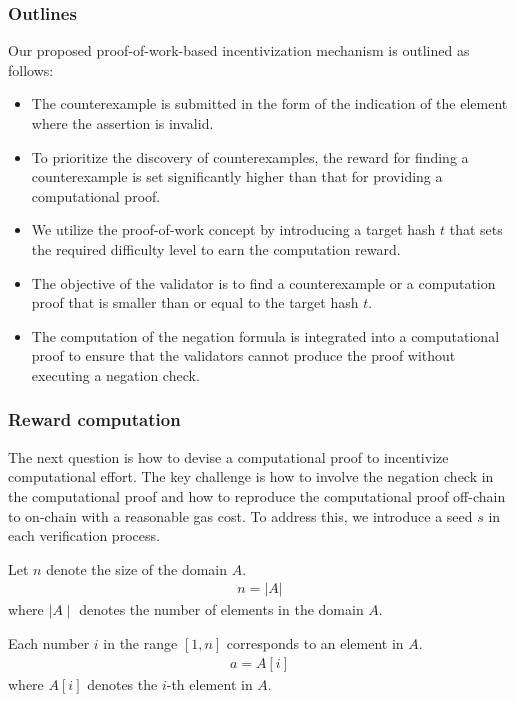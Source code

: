 \documentclass[runningheads]{llncs}
\begin{document}
\subsubsection{Outlines}
Our proposed proof-of-work-based incentivization mechanism is outlined as follows:
\begin{itemize}
\item The counterexample is submitted in the form of the indication of the element where the assertion is invalid.
\item To prioritize the discovery of counterexamples, the reward for finding a counterexample is set significantly higher than that for providing a computational proof.
\item We utilize the proof-of-work concept by introducing a target hash \( t \) that sets the required difficulty level to earn the computation reward.
\item The objective of the validator is to find a counterexample or a computation proof that is smaller than or equal to the target hash \( t \).
\item The computation of the negation formula is integrated into a computational proof to ensure that the validators cannot produce the proof without executing a negation check.
\end{itemize}
\subsubsection{Reward computation}
The next question is how to devise a computational proof to incentivize computational effort. The key challenge is how to involve the negation check in the computational proof and how to reproduce the computational proof off-chain to on-chain with a reasonable gas cost. To address this, we introduce a seed $s$ in each verification process.

Let \( n \) denote the size of the domain \( A \). 
\begin{align}
n = |A|
\end{align}
where $\mid A \mid$ denotes the number of elements in the domain $A$.

Each number \( i \) in the range \([1, n]\) corresponds to an element in \( A \). 
\begin{align}
a=A[i]
\end{align}
where $A[i]$ denotes the $i$-th element in $A$.
\end{document}
